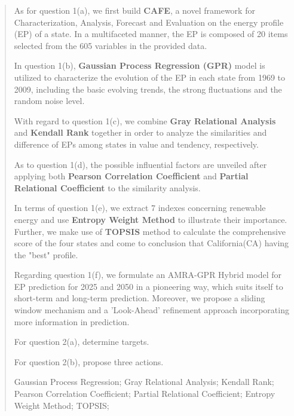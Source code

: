 \begin{abstract}
\indent 
    
    As for question 1(a), we first build \textbf{CAFE}, a novel framework for Characterization, Analysis, Forecast and Evaluation on the energy profile (EP) of a state. In a multifaceted manner, the EP is composed of 20 items selected from the 605 variables in the provided data. 
    
    In question 1(b), \textbf{Gaussian Process Regression (GPR)} model is utilized to characterize the evolution of the EP in each state from 1969 to 2009, including the basic evolving trends, the strong fluctuations and the random noise level.
    
    With regard to question 1(c), we combine \textbf{Gray Relational Analysis} and \textbf{Kendall Rank} together in order to analyze the similarities and difference of EPs among states in value and tendency, respectively.
    
    As to question 1(d), the possible influential factors are unveiled after applying both \textbf{Pearson Correlation Coefficient} and \textbf{Partial Relational Coefficient} to the similarity analysis.
    
    In terms of question 1(e), we extract 7 indexes concerning renewable energy and use \textbf{Entropy Weight Method} to illustrate their importance. Further, we make use of \textbf{TOPSIS} method to calculate the comprehensive score of the four states and come to conclusion that California(CA) having the "best" profile.
    
    Regarding question 1(f), we formulate an AMRA-GPR Hybrid model for EP prediction for 2025 and 2050 in a pioneering way, which suits itself to short-term and long-term prediction. Moreover, we propose a sliding window mechanism and a 'Look-Ahead' refinement approach incorporating more information in prediction.
    
    For question 2(a), determine targets.
    
    For question 2(b), propose three actions.
    
    
	\begin{keywords}
	\vspace{5pt}
    Gaussian Process Regression; Gray Relational Analysis; Kendall Rank; Pearson Correlation Coefficient; Partial Relational Coefficient; Entropy Weight Method; TOPSIS; 
	\end{keywords}
\end{abstract}